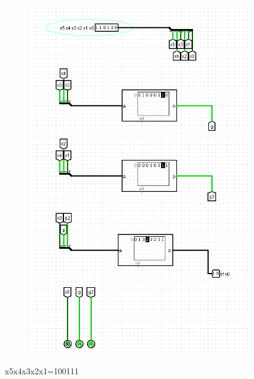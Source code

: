\documentclass[]{article}
\begin{document}
\begin{figure}[H]
	\centering
	\includegraphics[width=0.88\textwidth]{test3_110100.png}
\end{figure}
\newpage
x5x4x3x2x1=100111
\end{document}
